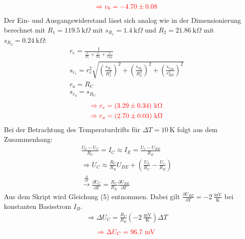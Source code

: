 \begin{gather*}
    \textcolor{red}{\Rightarrow v_6 = -4.70 \pm 0.08}
\end{gather*}
Der Ein- und Ausgangswiderstand lässt sich analog wie in der Dimensionierung berechnet mit $R_1=119.5~\text{k}\Omega$ mit $s_{R_1}=1.4~\text{k}\Omega$ und $R_2=21.86~\text{k}\Omega$ mit $s_{R_2}=0.24~\text{k}\Omega$:
\begin{gather}
    r_e = \frac{1}{\frac{1}{R_1}+\frac{1}{R_2}+\frac{1}{r_{BE}}} \\
    s_{r_e} = r_e^2\sqrt{\left(\frac{s_{R_1}}{R_1^2}\right)^2 + \left(\frac{s_{R_2}}{R_2^2}\right)^2 + \left(\frac{s_{r_{BE}}}{r_{BE}^2}\right)^2}\\
    r_a = R_C \\
    s_{r_a} = s_{R_C}
\end{gather}
\begin{gather*}
    \textcolor{red}{\Rightarrow r_e = (3.29 \pm 0.34)~\text{k}\Omega}\\
    \textcolor{red}{\Rightarrow r_a = (2.70 \pm 0.03)~\text{k}\Omega}
\end{gather*}
Bei der Betrachtung des Temperaturdrifts für $\Delta T = 10~\text{K}$ folgt aus dem Zusammenhang:
\begin{gather}
    \frac{U_0-U_C}{R_C}=I_C\approx I_E=\frac{U_e-U_{BE}}{R_E}\\
    \Rightarrow U_C \approx \frac{R_C}{R_E} U_{BE} +(\frac{U_0}{R_C}-\frac{U_e}{R_E})\\
    \xrightarrow{\frac{\partial}{\partial T}}\frac{\partial U_C}{\partial T}=\frac{R_C}{R_E}\frac{\partial U_{BE}}{\partial T}
\end{gather}
Aus dem Skript wird Gleichung (5) entnommen. Dabei gilt $\frac{\partial U_{BE}}{\partial T}=-2~\frac{\text{mV}}{\text{K}}$ bei konstanten Basisstrom $I_B$.
\begin{align}
    \Rightarrow \Delta U_C = \frac{R_C}{R_E} (-2~\frac{\text{mV}}{\text{K}}) \Delta T 
\end{align}
\begin{align*}
    \textcolor{red}{\Rightarrow \Delta U_C = 96.7~\text{mV}}
\end{align*}

